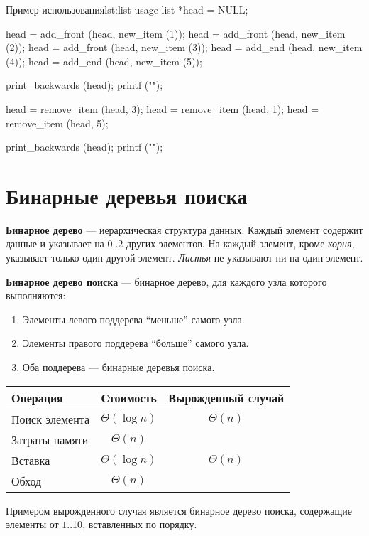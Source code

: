 \begin{clst}{Пример использования}{lst:list-usage}
list *head = NULL;

head = add_front (head, new_item (1));
head = add_front (head, new_item (2));
head = add_front (head, new_item (3));
head = add_end (head, new_item (4));
head = add_end (head, new_item (5));

print_backwards (head);
printf ("\n");

head = remove_item (head, 3);
head = remove_item (head, 1);
head = remove_item (head, 5);

print_backwards (head);
printf ("\n");
\end{clst}

\section{Бинарные деревья поиска}
\label{sec:trees}

\textbf{Бинарное дерево} --- иерархическая структура данных. Каждый элемент содержит данные и указывает на $0..2$ других элементов. На каждый элемент, кроме \emph{корня}, указывает только один другой элемент. \emph{Листья} не указывают ни на один элемент.

\textbf{Бинарное дерево поиска} --- бинарное дерево, для каждого узла которого выполняются:
\begin{enumerate}
  \item Элементы левого поддерева ``меньше'' самого узла.
  \item Элементы правого поддерева ``больше'' самого узла.
  \item Оба поддерева --- бинарные деревья поиска.
\end{enumerate}

\begin{center}
  \begin{tabular}{lcc}
    \toprule
    Операция & Стоимость & Вырожденный случай \\
    \midrule
    Поиск элемента & $\Theta(\log n)$ & $\Theta(n)$ \\
    Затраты памяти & $\Theta(n)$ & \\
    Вставка & $\Theta(\log n)$ & $\Theta(n)$ \\
    Обход & $\Theta(n)$ & \\
    \bottomrule
  \end{tabular}
\end{center}

Примером вырожденного случая является бинарное дерево поиска, содержащие элементы от $1..10$, вставленных по порядку.

